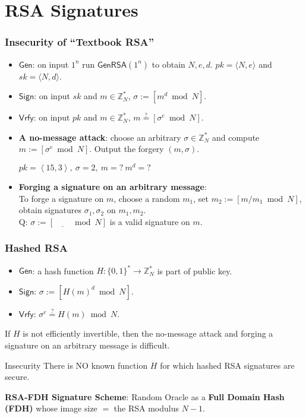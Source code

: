 \section{RSA Signatures}
\begin{frame}\frametitle{Insecurity of ``Textbook RSA''}
\begin{construction}
\begin{itemize}
\item $\mathsf{Gen}$: on input $1^n$ run $\mathsf{GenRSA}(1^n)$ to obtain $N,e,d$. $pk = \langle N,e \rangle$ and $sk = \langle N,d \rangle$.
\item $\mathsf{Sign}$: on input $sk$ and $m \in \mathbb{Z}^*_N$, $\sigma:= [m^d \bmod N]$.
\item $\mathsf{Vrfy}$: on input $pk$ and $m \in \mathbb{Z}^*_N$, $m \overset{?}{=} [\sigma^e \bmod N]$.
\end{itemize}
\end{construction}
\begin{itemize}
\item \textbf{A no-message attack}:
choose an arbitrary $\sigma \in \mathbb{Z}^*_N$ and compute $m := [\sigma^e \bmod N]$. Output the forgery $(m,\sigma)$.
\begin{exampleblock}{$pk = \left<15, 3\right>,\ \sigma = 2,\ m = ?\ m^{d} = ?$}
\end{exampleblock}
\item \textbf{Forging a signature on an arbitrary message}:\\
To forge a signature on $m$, choose a random $m_1$, set $m_2 := [m/m_1 \bmod N]$,  obtain signatures $\sigma_1, \sigma_2$ on $m_1, m_2$. \\
\alert{Q: $\sigma := [\underline{\qquad} \bmod N]$ is a valid signature on $m$.}
\end{itemize}
\end{frame}
\begin{frame}\frametitle{Hashed RSA}
\begin{itemize}
\item $\mathsf{Gen}$: a hash function $H : \{0,1\}^* \to \mathbb{Z}_N^*$ is part of public key.
\item $\mathsf{Sign}$: $\sigma := [H(m)^d \bmod N]$.
\item $\mathsf{Vrfy}$: $\sigma^e \overset{?}{=} H(m) \bmod N$.
\end{itemize}
If $H$ is not efficiently invertible, then the no-message attack and forging a signature on an arbitrary message is difficult.
\begin{alertblock}{Insecurity}
There is NO known function $H$ for which hashed RSA signatures are secure.
\end{alertblock}
\textbf{RSA-FDH Signature Scheme}: Random Oracle as a \textbf{Full Domain Hash (FDH)} whose image size $=$ the RSA modulus $N-1$.
\end{frame}
